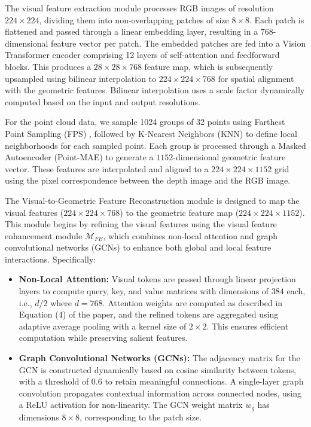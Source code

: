 The visual feature extraction module processes RGB images of resolution $224 \times 224$, dividing them into non-overlapping patches of size $8 \times 8$. Each patch is flattened and passed through a linear embedding layer, resulting in a $768$-dimensional feature vector per patch. The embedded patches are fed into a Vision Transformer encoder comprising 12 layers of self-attention and feedforward blocks. This produces a $28 \times 28 \times 768$ feature map, which is subsequently upsampled using bilinear interpolation to $224 \times 224 \times 768$ for spatial alignment with the geometric features. Bilinear interpolation uses a scale factor dynamically computed based on the input and output resolutions.

For the point cloud data, we sample 1024 groups of 32 points using Farthest Point Sampling (FPS) \cite{qi2017pointnet++}, followed by K-Nearest Neighbors (KNN) to define local neighborhoods for each sampled point. Each group is processed through a Masked Autoencoder (Point-MAE) \cite{pang2022masked} to generate a $1152$-dimensional geometric feature vector. These features are interpolated and aligned to a $224 \times 224 \times 1152$ grid using the pixel correspondence between the depth image and the RGB image.

The Visual-to-Geometric Feature Reconstruction module is designed to map the visual features ($224 \times 224 \times 768$) to the geometric feature map ($224 \times 224 \times 1152$). This module begins by refining the visual features using the visual feature enhancement module $\mathcal{M}_{FE}$, which combines non-local attention and graph convolutional networks (GCNs) to enhance both global and local feature interactions. Specifically:
\begin{itemize}
    \item \textbf{Non-Local Attention:} Visual tokens are passed through linear projection layers to compute query, key, and value matrices with dimensions of $384$ each, i.e., $d/2$ where $d = 768$. Attention weights are computed as described in Equation (4) of the paper, and the refined tokens are aggregated using adaptive average pooling with a kernel size of $2 \times 2$. This ensures efficient computation while preserving salient features.
    \item \textbf{Graph Convolutional Networks (GCNs):} The adjacency matrix for the GCN is constructed dynamically based on cosine similarity between tokens, with a threshold of 0.6 to retain meaningful connections. A single-layer graph convolution propagates contextual information across connected nodes, using a ReLU activation for non-linearity. The GCN weight matrix $w_g$ has dimensions $8 \times 8$, corresponding to the patch size.
\end{itemize}

